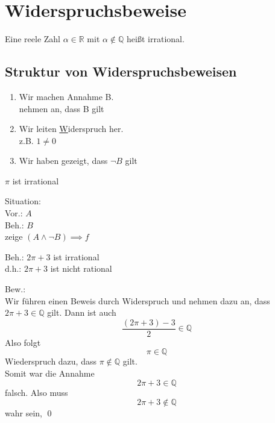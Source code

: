 \documentclass{gadsescript}
\begin{document}
\section{Widerspruchsbeweise}
\begin{definition}
	\label{def:IrrationaleZahlen}
	Eine reele Zahl $ \alpha \in \mathbb{R} $ mit $ \alpha \notin \mathbb{Q} $ heißt irrational.
\end{definition}

\subsection{Struktur von Widerspruchsbeweisen}
\begin{enumerate}
	\item Wir machen Annahme B.\\
		nehmen an, dass B gilt
	\item Wir leiten \underline Widerspruch her.\\
		z.B. $ 1 \neq 0 $\\
	\item Wir haben gezeigt, dass $ \neg B $ gilt
\end{enumerate}

\begin{subtheorem}
	\label{theorem:PiIstIrrational}
	$ \pi $ ist irrational
\end{subtheorem}
\begin{subproof}
	Situation:\\
	Vor.: $A$ \\
	Beh.: $B$ \\
	zeige $ ( A \wedge \neg B ) \implies f $\par
	Beh.: $ 2 \pi + 3 $ ist irrational\\
	d.h.: $ 2 \pi + 3 $ ist nicht rational\par
	Bew.:\\
	Wir führen einen Beweis durch Widerspruch und nehmen dazu an, dass $ 2 \pi + 3 \in \mathbb{Q} $ gilt. Dann ist auch
	\[ \frac{ ( 2 \pi + 3 ) - 3 }{ 2 } \in \mathbb{Q} \]
	Also folgt
	\[ \pi \in \mathbb{Q} \]
	Wiederspruch dazu, dass $ \pi \notin \mathbb{Q} $ gilt.\\
	Somit war die Annahme
	\[ 2 \pi + 3 \in \mathbb{Q} \]
	falsch. Also muss
	\[ 2 \pi + 3 \notin \mathbb{Q} \]
	wahr sein, \qed
\end{subproof}
\end{document}
